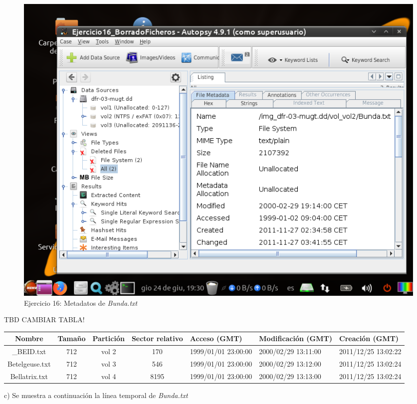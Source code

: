 \documentclass[11pt]{article}
\begin{document}
\begin{figure}[H]
    \caption{Ejercicio 16: Metadatos de \textit{Bunda.txt}}
    \centering
    \includegraphics[scale=0.7]{e16-7.png}
\end{figure}

TBD CAMBIAR TABLA!
\begin{table}[H]
    \centering
    \begin{tabular}{|c|c|c|c|p{2cm}|p{2cm}|p{2cm}|}
        \hline
        Nombre & Tamaño & Partición & Sector relativo & Acceso (GMT) & Modificación (GMT) & Creación (GMT) \\
        \hline\hline
        \_BEID.txt & 712 & vol 2 & 170 & 1999/01/01 23:00:00 & 2000/02/29 13:11:00 & 2011/12/25 13:02:22 \\
        \hline
        Betelgeuse.txt & 712 & vol 3 & 546 & 1999/01/01 23:00:00 & 2000/02/29 13:12:00 & 2011/12/25 13:02:24 \\
        \hline
        Bellatrix.txt & 712 & vol 4 & 8195 & 1999/01/01 23:00:00 & 2000/02/29 13:13:00 & 2011/12/25 13:02:24 \\
        \hline
    \end{tabular}
\end{table}

c) Se muestra a continuación la línea temporal de \textit{Bunda.txt}
\end{document}

